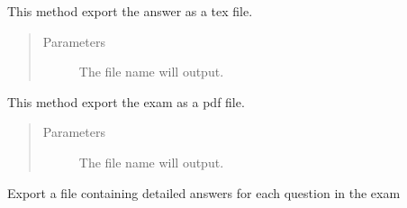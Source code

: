 \documentclass[letterpaper,10pt,english]{sphinxmanual}
\begin{document}
\begin{fulllineitems}
\begin{fulllineitems}
\end{fulllineitems}


\begin{fulllineitems}
\label{\detokenize{index:pytexexam.latexexam.LatexExam.export_pdf_answer}}
This method export the answer as a tex file.
\begin{quote}\begin{description}
\item[{Parameters}] \leavevmode
{} \textendash{} The file name will output.

\end{description}\end{quote}

\end{fulllineitems}


\begin{fulllineitems}
\label{\detokenize{index:pytexexam.latexexam.LatexExam.export_pdf_exam}}
This method export the exam as a pdf file.
\begin{quote}\begin{description}
\item[{Parameters}] \leavevmode
{} \textendash{} The file name will output.

\end{description}\end{quote}

\end{fulllineitems}


\begin{fulllineitems}
\label{\detokenize{index:pytexexam.latexexam.LatexExam.export_pdf_solution}}
Export a file containing detailed answers for each question in the exam


\end{fulllineitems}
\end{fulllineitems}
\end{document}
